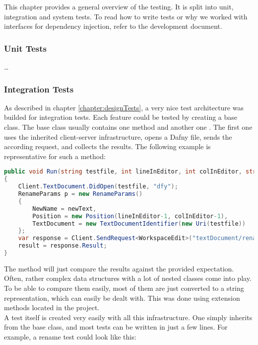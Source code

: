 This chapter provides a general overview of the testing. It is split into unit, integration and system tests. To read how to write tests or why we worked with interfaces for dependency injection, refer to the development document.

\subsubsection{Unit Tests}
\dots
{}


\subsubsection{Integration Tests}
As described in chapter \ref{chapter:designTests}, a very nice test architecture was builded for integration tests. Each feature could be tested by creating a base class. The base class usually contains one method  and another one . The first one uses the inherited client-server infrastructure, opens a Dafny file, sends the according request, and collects the results. The following example is representative for such a method:

\begin{lstlisting}[language=csharp, caption={Finding a Declaration}, captionpos=b, label={lst:visitorfinddecl}]
public void Run(string testfile, int lineInEditor, int colInEditor, string newText = "newText")
{
    Client.TextDocument.DidOpen(testfile, "dfy");
    RenameParams p = new RenameParams()
    {
        NewName = newText,
        Position = new Position(lineInEditor-1, colInEditor-1),
        TextDocument = new TextDocumentIdentifier(new Uri(testfile))
    };
    var response = Client.SendRequest<WorkspaceEdit>("textDocument/rename", p, CancellationSource.Token);
    result = response.Result;
}
\end{lstlisting}

The  method will just compare the results against the provided expectation. Often, rather complex data structures with a lot of nested classes come into play. To be able to compare them easily, most of them are just converted to a string representation, which can easily be dealt with. This was done using extension methods located in the  project.\\

A test itself is created very easily with all this infrastructure. One simply inherits from the base class, and most tests can be written in just a few lines. For example, a rename test could look like this:

